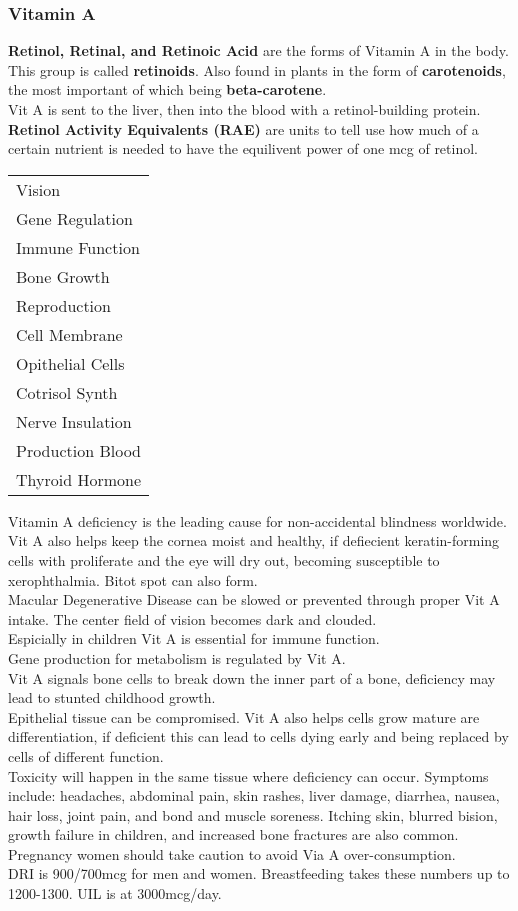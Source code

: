 \documentclass[letterpaper, 11pt]{article}
\begin{document}
\subsubsection{Vitamin A}
\label{sec:org79fd637}
\textbf{Retinol, Retinal, and Retinoic Acid} are the forms of Vitamin A in the body. This group is called \textbf{retinoids}. Also found in plants in the form of \textbf{carotenoids}, the most important of which being \textbf{beta-carotene}.\\
Vit A is sent to the liver, then into the blood with a retinol-building protein. \textbf{Retinol Activity Equivalents (RAE)} are units to tell use how much of a certain nutrient is needed to have the equilivent power of one mcg of retinol.\\
\begin{center}
\begin{tabular}{l}
Vision\\
Gene Regulation\\
Immune Function\\
Bone Growth\\
Reproduction\\
Cell Membrane\\
Opithelial Cells\\
Cotrisol Synth\\
Nerve Insulation\\
Production Blood\\
Thyroid Hormone\\
\end{tabular}
\end{center}
Vitamin A deficiency is the leading cause for non-accidental blindness worldwide. Vit A also helps keep the cornea moist and healthy, if defiecient keratin-forming cells with proliferate and the eye will dry out, becoming susceptible to xerophthalmia. Bitot spot can also form.\\
Macular Degenerative Disease can be slowed or prevented through proper Vit A intake. The center field of vision becomes dark and clouded.\\
Espicially in children Vit A is essential for immune function.\\
Gene production for metabolism is regulated by Vit A.\\
Vit A signals bone cells to break down the inner part of a bone, deficiency may lead to stunted childhood growth.\\
Epithelial tissue can be compromised. Vit A also helps cells grow mature are differentiation, if deficient this can lead to cells dying early and being replaced by cells of different function.\\
Toxicity will happen in the same tissue where deficiency can occur. Symptoms include: headaches, abdominal pain, skin rashes, liver damage, diarrhea, nausea, hair loss, joint pain, and bond and muscle soreness. Itching skin, blurred bision, growth failure in children, and increased bone fractures are also common.\\
Pregnancy women should take caution to avoid Via A over-consumption.\\
DRI is 900/700mcg for men and women. Breastfeeding takes these numbers up to 1200-1300. UIL is at 3000mcg/day.\\
\end{document}

